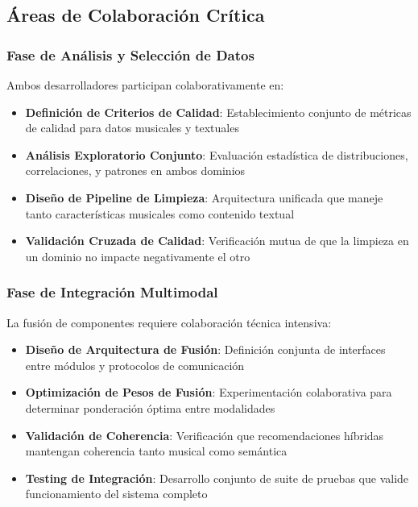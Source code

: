 \documentclass[12pt,a4paper]{article}
\begin{document}
\subsection{Áreas de Colaboración Crítica}

\subsubsection{Fase de Análisis y Selección de Datos}

Ambos desarrolladores participan colaborativamente en:

\begin{itemize}
    \item \textbf{Definición de Criterios de Calidad}: Establecimiento conjunto de métricas de calidad para datos musicales y textuales
    \item \textbf{Análisis Exploratorio Conjunto}: Evaluación estadística de distribuciones, correlaciones, y patrones en ambos dominios
    \item \textbf{Diseño de Pipeline de Limpieza}: Arquitectura unificada que maneje tanto características musicales como contenido textual
    \item \textbf{Validación Cruzada de Calidad}: Verificación mutua de que la limpieza en un dominio no impacte negativamente el otro
\end{itemize}

\subsubsection{Fase de Integración Multimodal}

La fusión de componentes requiere colaboración técnica intensiva:

\begin{itemize}
    \item \textbf{Diseño de Arquitectura de Fusión}: Definición conjunta de interfaces entre módulos y protocolos de comunicación
    \item \textbf{Optimización de Pesos de Fusión}: Experimentación colaborativa para determinar ponderación óptima entre modalidades
    \item \textbf{Validación de Coherencia}: Verificación que recomendaciones híbridas mantengan coherencia tanto musical como semántica
    \item \textbf{Testing de Integración}: Desarrollo conjunto de suite de pruebas que valide funcionamiento del sistema completo
\end{itemize}
\end{document}
